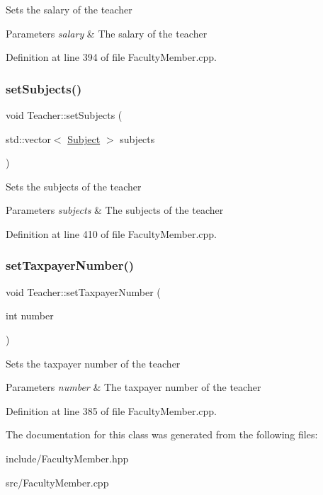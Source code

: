 Sets the salary of the teacher 
\begin{DoxyParams}{Parameters}
{\em salary} & The salary of the teacher \\
\hline
\end{DoxyParams}


Definition at line 394 of file Faculty\+Member.\+cpp.

\mbox{\label{classTeacher_aac2aba678e32ce5a5f57989b55dc0952}} 
\subsubsection{\texorpdfstring{set\+Subjects()}{setSubjects()}}
{\footnotesize\ttfamily void Teacher\+::set\+Subjects (\begin{DoxyParamCaption}\item[{std\+::vector$<$ \hyperlink{classSubject}{Subject} $>$}]{subjects }\end{DoxyParamCaption})}

Sets the subjects of the teacher 
\begin{DoxyParams}{Parameters}
{\em subjects} & The subjects of the teacher \\
\hline
\end{DoxyParams}


Definition at line 410 of file Faculty\+Member.\+cpp.

\mbox{\label{classTeacher_a76e9731a32474291c679de1b7c8ddad5}} 
\subsubsection{\texorpdfstring{set\+Taxpayer\+Number()}{setTaxpayerNumber()}}
{\footnotesize\ttfamily void Teacher\+::set\+Taxpayer\+Number (\begin{DoxyParamCaption}\item[{int}]{number }\end{DoxyParamCaption})}

Sets the taxpayer number of the teacher 
\begin{DoxyParams}{Parameters}
{\em number} & The taxpayer number of the teacher \\
\hline
\end{DoxyParams}


Definition at line 385 of file Faculty\+Member.\+cpp.



The documentation for this class was generated from the following files\+:\begin{DoxyCompactItemize}
\item 
include/Faculty\+Member.\+hpp\item 
src/Faculty\+Member.\+cpp\end{DoxyCompactItemize}
